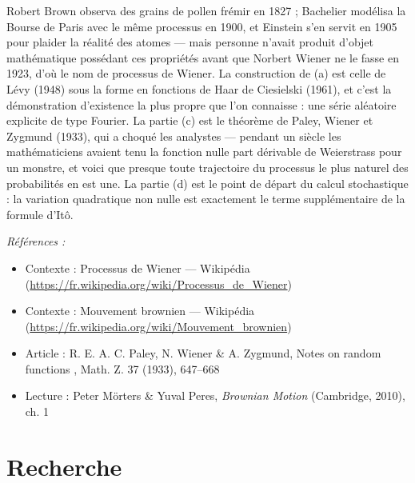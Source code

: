\documentclass[11pt]{article}
\newenvironment{refs}{\par\small\noindent\emph{Références :}\begin{itemize}\setlength\itemsep{0pt}}{\end{itemize}\normalsize}
\begin{document}
\noindent Robert Brown observa des grains de pollen frémir en 1827 ; Bachelier modélisa
la Bourse de Paris avec le même processus en 1900, et Einstein s'en servit en 1905 pour plaider la
réalité des atomes --- mais personne n'avait produit d'objet mathématique possédant ces propriétés
avant que Norbert Wiener ne le fasse en 1923, d'où le nom de processus de Wiener. La construction
de (a) est celle de Lévy (1948) sous la forme en fonctions de Haar de Ciesielski (1961), et c'est
la démonstration d'existence la plus propre que l'on connaisse : une série aléatoire explicite de
type Fourier. La partie (c) est le théorème de Paley, Wiener et Zygmund (1933), qui a choqué les
analystes --- pendant un siècle les mathématiciens avaient tenu la fonction nulle part dérivable de
Weierstrass pour un monstre, et voici que presque toute trajectoire du processus le plus naturel
des probabilités en est une. La partie (d) est le point de départ du calcul stochastique : la
variation quadratique non nulle est exactement le terme supplémentaire de la formule d'Itô.

\begin{refs}
\item Contexte : Processus de Wiener --- Wikipédia (\url{https://fr.wikipedia.org/wiki/Processus_de_Wiener})
\item Contexte : Mouvement brownien --- Wikipédia (\url{https://fr.wikipedia.org/wiki/Mouvement_brownien})
\item Article : R. E. A. C. Paley, N. Wiener \& A. Zygmund, \og{} Notes on random functions \fg{}, Math. Z. 37 (1933), 647--668
\item Lecture : Peter Mörters \& Yuval Peres, \textit{Brownian Motion} (Cambridge, 2010), ch. 1
\end{refs}

\bigskip


\section*{Recherche}
\end{document}
